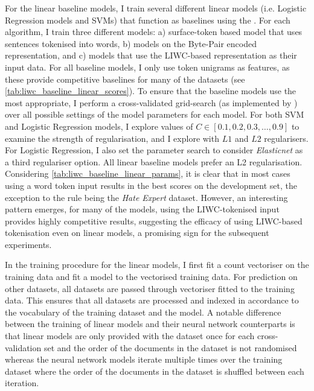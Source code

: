 For the linear baseline models, I train several different linear models (i.e. Logistic Regression models and SVMs) that function as baselines using the \citet{Pedregosa:2015}.
For each algorithm, I train three different models: a) surface-token based model that uses sentences tokenised into words, b) models on the Byte-Pair encoded representation, and c) models that use the LIWC-based representation as their input data.
For all baseline models, I only use token unigrams as features, as these provide competitive baselines for many of the datasets (see \autoref{tab:liwc_baseline_linear_scores}).
To ensure that the baseline models use the most appropriate, I perform a cross-validated grid-search (as implemented by \citet{Pedregosa:2015}) over all possible settings of the model parameters for each model.
For both SVM and Logistic Regression models, I explore values of $C\in [0.1, 0.2, 0.3, \ldots, 0.9]$ to examine the strength of regularisation, and I explore with $L1$ and $L2$ regularisers. 
For Logistic Regression, I also set the parameter search to consider \textit{Elasticnet} as a third regulariser option.
All linear baseline models prefer an L2 regularisation. Considering \cref{tab:liwc_baseline_linear_params}, it is clear that in most cases using a word token input results in the best scores on the development set, the exception to the rule being the \textit{Hate Expert} dataset. However, an interesting pattern emerges, for many of the models, using the LIWC-tokenised input provides highly competitive results, suggesting the efficacy of using LIWC-based tokenisation even on linear models, a promising sign for the subsequent experiments.

In the training procedure for the linear models, I first fit a count vectoriser on the training data and fit a model to the vectorised training data. For prediction on other datasets, all datasets are passed through vectoriser fitted to the training data. This ensures that all datasets are processed and indexed in accordance to the vocabulary of the training dataset and the model. A notable difference between the training of linear models and their neural network counterparts is that linear models are only provided with the dataset once for each cross-validation set and the order of the documents in the dataset is not randomised whereas the neural network models iterate multiple times over the training dataset where the order of the documents in the dataset is shuffled between each iteration.

